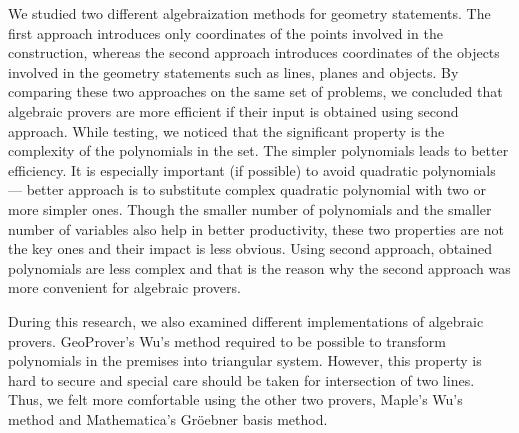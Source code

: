 \documentclass[final,1p,times,authoryear]{elsarticle}
\begin{document}
We studied two different algebraization methods for geometry
statements. The first approach introduces only coordinates of the
points involved in the construction, whereas the second approach
introduces coordinates of the objects involved in the geometry
statements such as lines, planes and objects. By comparing these two
approaches on the same set of problems, we concluded that algebraic
provers are more efficient if their input is obtained using second
approach. While testing, we noticed that the significant property is
the complexity of the polynomials in the set. The simpler polynomials
leads to better efficiency. It is especially important (if possible)
to avoid quadratic polynomials --- better approach is to substitute
complex quadratic polynomial with two or more simpler ones. Though the
smaller number of polynomials and the smaller number of variables also
help in better productivity, these two properties are not the key ones
and their impact is less obvious. Using second approach, obtained
polynomials are less complex and that is the reason why the second
approach was more convenient for algebraic provers.

During this research, we also examined different implementations of
algebraic provers. GeoProver's Wu's method required to be possible to
transform polynomials in the premises into triangular system. However,
this property is hard to secure and special care should be taken for
intersection of two lines. Thus, we felt more comfortable using the
other two provers, Maple's Wu's method and Mathematica's Gr\"oebner
basis method.





\end{document}
